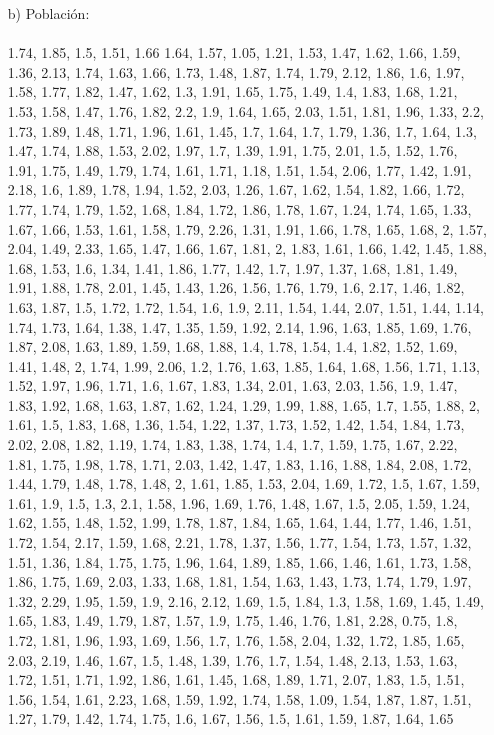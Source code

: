 \documentclass[a4paper,12pt]{article}
\begin{document}
\begin{enumerate}
\item [b)] Poblaci\'on:\\\\
1.74,	1.85,	1.5,    1.51,	1.66	1.64,
1.57,	1.05,	1.21,	1.53,	1.47,	1.62,
1.66,	1.59,	1.36,	2.13,	1.74,	1.63,
1.66,	1.73,	1.48,	1.87,	1.74,	1.79,
2.12,	1.86,	1.6,    1.97,	1.58,	1.77,
1.82,	1.47,	1.62,	1.3,    1.91,	1.65,
1.75,	1.49,	1.4,    1.83,	1.68,	1.21,
1.53,	1.58,	1.47,	1.76,	1.82,	2.2,
1.9,    1.64,	1.65,	2.03,	1.51,	1.81,
1.96,	1.33,	2.2,    1.73,	1.89,	1.48,
1.71,	1.96,	1.61,	1.45,	1.7,    1.64,
1.7,    1.79,	1.36,	1.7,    1.64,	1.3,
1.47,	1.74,	1.88,	1.53,	2.02,	1.97,
1.7,    1.39,	1.91,	1.75,	2.01,	1.5,
1.52,	1.76,	1.91,	1.75,	1.49,	1.79,
1.74,	1.61,	1.71,	1.18,	1.51,	1.54,
2.06,	1.77,	1.42,	1.91,	2.18,	1.6,
1.89,	1.78,	1.94,	1.52,	2.03,	1.26,
1.67,	1.62,	1.54,	1.82,	1.66,	1.72,
1.77,	1.74,	1.79,	1.52,	1.68,	1.84,
1.72,	1.86,	1.78,	1.67,	1.24,	1.74,
1.65,	1.33,	1.67,	1.66,	1.53,	1.61,
1.58,	1.79,	2.26,	1.31,	1.91,	1.66,
1.78,	1.65,	1.68,	2,      1.57,	2.04,
1.49,	2.33,	1.65,	1.47,	1.66,	1.67,
1.81,	2,      1.83,	1.61,	1.66,	1.42,
1.45,	1.88,	1.68,	1.53,	1.6,    1.34,
1.41,	1.86,	1.77,	1.42,	1.7,    1.97,
1.37,	1.68,	1.81,	1.49,	1.91,	1.88,
1.78,	2.01,	1.45,	1.43,	1.26,	1.56,
1.76,	1.79,	1.6,    2.17,	1.46,	1.82,
1.63,	1.87,	1.5,	1.72,	1.72,	1.54,
1.6,    1.9,    2.11,	1.54,	1.44,	2.07,
1.51,	1.44,	1.14,	1.74,	1.73,	1.64,
1.38,	1.47,	1.35,	1.59,	1.92,	2.14,
1.96,	1.63,	1.85,	1.69,	1.76,	1.87,
2.08,	1.63,	1.89,	1.59,	1.68,	1.88,
1.4,    1.78,	1.54,	1.4,    1.82,	1.52,
1.69,	1.41,	1.48,	2,      1.74,	1.99,
2.06,	1.2,    1.76,	1.63,	1.85,	1.64,
1.68,	1.56,	1.71,	1.13,	1.52,	1.97,
1.96,	1.71,	1.6,    1.67,	1.83,	1.34,
2.01,	1.63,	2.03,	1.56,	1.9,    1.47,
1.83,	1.92,	1.68,	1.63,	1.87,	1.62,
1.24,	1.29,	1.99,	1.88,	1.65,	1.7,
1.55,	1.88,	2,      1.61,	1.5,    1.83,
1.68,	1.36,	1.54,	1.22,	1.37,	1.73,
1.52,	1.42,	1.54,	1.84,	1.73,	2.02,
2.08,	1.82,	1.19,	1.74,	1.83,	1.38,
1.74,	1.4,    1.7,    1.59,	1.75,	1.67,
2.22,	1.81,	1.75,	1.98,	1.78,	1.71,
2.03,	1.42,	1.47,	1.83,	1.16,	1.88,
1.84,	2.08,	1.72,	1.44,	1.79,	1.48,
1.78,	1.48,	2,      1.61,	1.85,	1.53,
2.04,	1.69,	1.72,	1.5,    1.67,	1.59,
1.61,	1.9,    1.5,    1.3,    2.1,    1.58,
1.96,	1.69,	1.76,	1.48,	1.67,	1.5,
2.05,	1.59,	1.24,	1.62,	1.55,	1.48,
1.52,	1.99,	1.78,	1.87,	1.84,	1.65,
1.64,	1.44,	1.77,	1.46,	1.51,	1.72,
1.54,	2.17,	1.59,	1.68,	2.21,	1.78,
1.37,	1.56,	1.77,	1.54,	1.73,	1.57,
1.32,	1.51,	1.36,	1.84,	1.75,	1.75,
1.96,	1.64,	1.89,	1.85,	1.66,	1.46,
1.61,	1.73,	1.58,	1.86,	1.75,	1.69,
2.03,	1.33,	1.68,	1.81,	1.54,	1.63,
1.43,	1.73,	1.74,	1.79,	1.97,	1.32,
2.29,	1.95,	1.59,	1.9,    2.16,	2.12,
1.69,	1.5,    1.84,	1.3,    1.58,	1.69,
1.45,	1.49,	1.65,	1.83,	1.49,	1.79,
1.87,	1.57,	1.9,    1.75,	1.46,	1.76,
1.81,	2.28,	0.75,	1.8,    1.72,	1.81,
1.96,	1.93,	1.69,	1.56,	1.7,    1.76,
1.58,	2.04,	1.32,	1.72,	1.85,	1.65,
2.03,	2.19,	1.46,	1.67,	1.5,    1.48,
1.39,	1.76,	1.7,    1.54,	1.48,	2.13,
1.53,	1.63,	1.72,	1.51,	1.71,	1.92,
1.86,	1.61,	1.45,	1.68,	1.89,	1.71,
2.07,	1.83,	1.5,    1.51,	1.56,	1.54,
1.61,	2.23,	1.68,	1.59,	1.92,	1.74,
1.58,	1.09,	1.54,	1.87,	1.87,	1.51,
1.27,	1.79,	1.42,	1.74,	1.75,	1.6,
1.67,	1.56,	1.5,    1.61,	1.59,	1.87,
1.64,	1.65\\


\end{enumerate}
\end{document}
